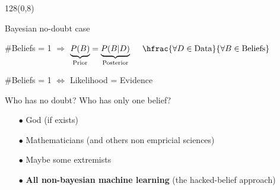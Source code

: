 \documentclass[shownotes]{beamer}
\begin{document}
\begin{frame}
 \begin{textblock}{128}(0,8)
\begin{center}
 \Large Bayesian no-doubt case
\end{center}
\end{textblock}
\vspace{0.5cm}


 \begin{mdframed}[backgroundcolor=black!15]
 \centering
 $\#$Beliefs = 1 $\Longrightarrow$ $\underbrace{P(B)}_{\text{\scriptsize Prior}} = \underbrace{P(B|D)}_{\text{\scriptsize Posterior}} \ \ \ \ \hfrac{\forall D \in \text{Data}}{\forall B \in \text{Beliefs}}$
\end{mdframed}

 \vspace{0.9cm}
\pause 


\begin{mdframed}[backgroundcolor=black!15]
\centering
 $\#$Beliefs = 1  $\Longleftrightarrow$ Likelihood = Evidence  
\end{mdframed}
 

 

\end{frame}

\begin{frame}
 \vspace{0.5cm}


\begin{center}
 \centering \large
  Who has no doubt? Who has only one belief?
\end{center}
 
 \vspace{0.3cm}
 \pause
 
 \begin{itemize}
  \item[$\bullet$] God (if exists) \pause
  \item[$\bullet$] Mathematicians (and others non empricial sciences) \pause
  \item[$\bullet$] Maybe some extremists \pause
  \item[$\bullet$] \textbf{All non-bayesian machine learning} \pause (the hacked-belief approach)
 \end{itemize}

 
\end{frame}
\end{document}
